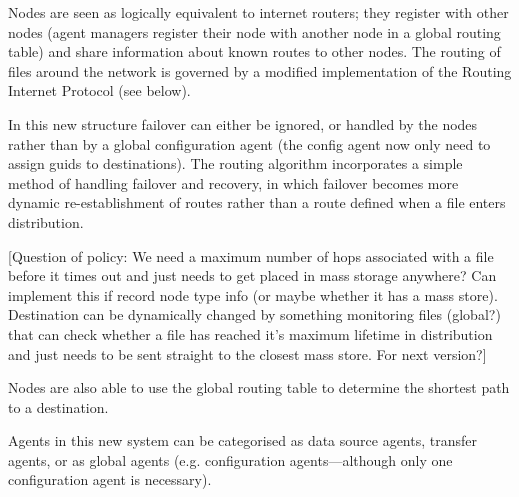 \documentclass{cmspaper}
\begin{document}
Nodes are seen as logically equivalent to internet routers; they
register with other nodes (agent managers register their node with
another node in a global routing table) and share information about
known routes to other nodes.  The routing of files around the network
is governed by a modified implementation of the Routing Internet
Protocol (see below).

In this new structure failover can either be ignored, or handled by
the nodes rather than by a global configuration agent (the config
agent now only need to assign guids to destinations).  The routing
algorithm incorporates a simple method of handling failover and
recovery, in which failover becomes more dynamic re-establishment of
routes rather than a route defined when a file enters distribution.

[Question of policy: We need a maximum number of hops associated with
a file before it times out and just needs to get placed in mass
storage anywhere? Can implement this if record node type info (or
maybe whether it has a mass store). Destination can be dynamically
changed by something monitoring files (global?) that can check whether
a file has reached it's maximum lifetime in distribution and just
needs to be sent straight to the closest mass store. For next
version?]

Nodes are also able to use the global routing table to determine the
shortest path to a destination.

Agents in this new system can be categorised as data source agents,
transfer agents, or as global agents (e.g. configuration
agents---although only one configuration agent is necessary).
\end{document}
